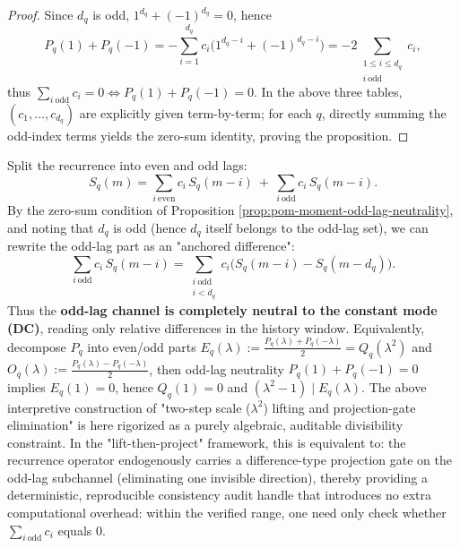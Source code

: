 \begin{proof}
Since \(d_q\) is odd, \(1^{d_q}+(-1)^{d_q}=0\), hence
\[
P_q(1)+P_q(-1)
= -\sum_{i=1}^{d_q} c_i\bigl(1^{d_q-i}+(-1)^{d_q-i}\bigr)
= -2\sum_{\substack{1\le i\le d_q\\ i\ \mathrm{odd}}}c_i,
\]
thus \(\sum_{i\ \mathrm{odd}}c_i=0\iff P_q(1)+P_q(-1)=0\).
In the above three tables, \((c_1,\dots,c_{d_q})\) are explicitly given term-by-term; for each \(q\), directly summing the odd-index terms yields the zero-sum identity, proving the proposition.
\end{proof}

\begin{remark}\label{rem:pom-moment-odd-lag-neutrality-gate}
Split the recurrence into even and odd lags:
\[
S_q(m)=\sum_{i\ \mathrm{even}}c_i\,S_q(m-i)\ +\ \sum_{i\ \mathrm{odd}}c_i\,S_q(m-i).
\]
By the zero-sum condition of Proposition \ref{prop:pom-moment-odd-lag-neutrality}, and noting that \(d_q\) is odd (hence \(d_q\) itself belongs to the odd-lag set), we can rewrite the odd-lag part as an "anchored difference":
\[
\sum_{i\ \mathrm{odd}}c_i\,S_q(m-i)
=\sum_{\substack{i\ \mathrm{odd}\\ i<d_q}}c_i\bigl(S_q(m-i)-S_q(m-d_q)\bigr).
\]
Thus the \textbf{odd-lag channel is completely neutral to the constant mode (DC)}, reading only relative differences in the history window.
Equivalently, decompose \(P_q\) into even/odd parts
\(
E_q(\lambda):=\frac{P_q(\lambda)+P_q(-\lambda)}{2}=Q_q(\lambda^2)
\)
and
\(
O_q(\lambda):=\frac{P_q(\lambda)-P_q(-\lambda)}{2}
\),
then odd-lag neutrality \(P_q(1)+P_q(-1)=0\) implies \(E_q(1)=0\), hence \(Q_q(1)=0\) and \((\lambda^2-1)\mid E_q(\lambda)\).
The above interpretive construction of "two-step scale (\(\lambda^2\)) lifting and projection-gate elimination" is here rigorized as a purely algebraic, auditable divisibility constraint.
In the "lift-then-project" framework, this is equivalent to: the recurrence operator endogenously carries a difference-type projection gate on the odd-lag subchannel (eliminating one invisible direction), thereby providing a deterministic, reproducible consistency audit handle that introduces no extra computational overhead: within the verified range, one need only check whether \(\sum_{i\ \mathrm{odd}}c_i\) equals \(0\).
\end{remark}

